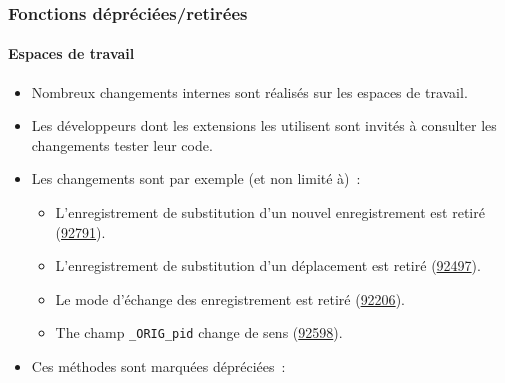 %

\begin{frame}[fragile]
	\frametitle{Fonctions dépréciées/retirées}
	\framesubtitle{Espaces de travail}

	\begin{itemize}
		\item Nombreux changements internes sont réalisés sur les espaces de travail.
		\item Les développeurs dont les extensions les utilisent sont invités à consulter les changements
			tester leur code.
		\item Les changements sont par exemple (et non limité à)~:

			\begin{itemize}\small
				\item L'enregistrement de substitution d'un nouvel enregistrement est retiré
					(\href{https://docs.typo3.org/c/typo3/cms-core/master/en-us/Changelog/11.0/Breaking-92791-NewPlaceholderRecordsRemovedInWorkspaces.html}{92791}).
				\item L'enregistrement de substitution d'un déplacement est retiré
					(\href{https://docs.typo3.org/c/typo3/cms-core/master/en-us/Changelog/11.0/Breaking-92497-WorkspacesMovePlaceholdersRemoved.html}{92497}).
				\item Le mode d'échange des enregistrement est retiré
					(\href{https://docs.typo3.org/c/typo3/cms-core/master/en-us/Changelog/11.0/Breaking-92206-RemoveWorkspaceSwappingOfElements.html}{92206}).
				\item The champ \texttt{\_ORIG\_pid} change de sens
					(\href{https://docs.typo3.org/c/typo3/cms-core/master/en-us/Changelog/11.0/Breaking-92598-Workspace-overlaysAuto-fixThePIDValueForMovedRecords.html}{92598}).
			\end{itemize}

		\item Ces méthodes sont marquées dépréciées~:


\end{itemize}
\end{frame}
